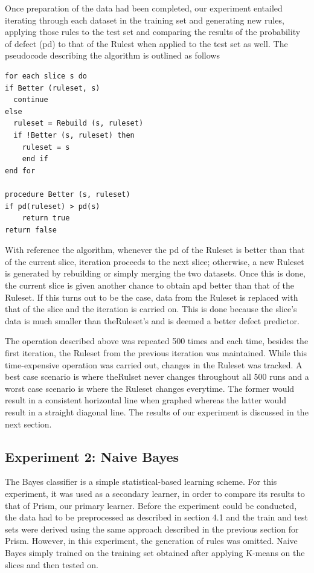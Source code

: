 \documentclass{sig-alternate}
\begin{document}
Once preparation of the data had been completed, our experiment entailed iterating through each dataset in the training set and generating new rules, applying those rules to the test set and comparing the results of the probability of defect (pd) to that of the Rulest when applied to the test set as well. The pseudocode describing the algorithm is outlined as follows


\begin{verbatim}
for each slice s do
if Better (ruleset, s)
  continue
else
  ruleset = Rebuild (s, ruleset)
  if !Better (s, ruleset) then
    ruleset = s
    end if
end for

procedure Better (s, ruleset)
if pd(ruleset) > pd(s)
    return true
return false

\end{verbatim}

With reference the algorithm, whenever the pd of the Ruleset is better than that of the current slice, iteration proceeds to the next slice; otherwise, a new Ruleset is generated by rebuilding or simply merging the two datasets. Once this is done, the current slice is given another chance to obtain apd better than that of the Ruleset. If this turns out to be the case, data from the Ruleset is replaced with that of the slice and the iteration is carried on. This is done because the slice's data is much smaller than theRuleset's and is deemed a better defect predictor.

The operation described above was repeated 500 times and each time, besides the first iteration, the Ruleset from the previous iteration was maintained. While this time-expensive operation was carried out, changes in the Ruleset was tracked. A best case scenario is where theRulset never changes throughout all 500 runs and a worst case scenario is where the Ruleset changes everytime. The former would result in a consistent horizontal line when graphed whereas the latter would result in a straight diagonal line. The results of our experiment is discussed in the next section.

\subsection{Experiment 2: Naive Bayes}

The Bayes classifier is a simple statistical-based learning scheme. For this experiment, it was used as a secondary learner, in order to compare its results to that of Prism, our primary learner. Before the experiment could be conducted, the data had to be preprocessed as described in section 4.1 and the train and test sets were derived using the same approach described in the previous section for Prism. However, in this experiment, the generation of rules was omitted. Naive Bayes simply trained on the training set obtained after applying K-means on the slices and then tested on.
\end{document}
